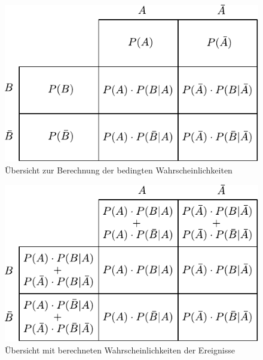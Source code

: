 \begin{figure}[h!]
        \centering
        \includegraphics[scale=\graphscale]{bedingte-wahrscheinlichkeit.pdf}
        \caption{Übersicht zur Berechnung der bedingten Wahrscheinlichkeiten}
\end{figure}

\begin{figure}[h!]
        \centering
        \includegraphics[scale=\graphscale]{bedingte-wahrscheinlichkeit-detail.pdf}
        \caption{Übersicht mit berechneten Wahrscheinlichkeiten der Ereignisse}
\end{figure}

